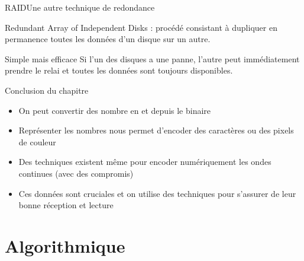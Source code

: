 \documentclass{beamer}
\begin{document}
\begin{frame}{RAID}{Une autre technique de redondance}
	\begin{definition}
		Redundant Array of Independent Disks : procédé consistant à dupliquer en permanence toutes les données d'un disque sur un autre.
	\end{definition}

	\begin{exampleblock}{Simple mais efficace}
		Si l'un des disques a une panne, l'autre peut immédiatement prendre le relai et toutes les données sont toujours disponibles.
	\end{exampleblock}
\end{frame}

\begin{frame}{Conclusion du chapitre}{}
	\begin{itemize}
		\item On peut convertir des nombre en et depuis le binaire
		\item Représenter les nombres nous permet d'encoder des caractères ou des pixels de couleur
		\item Des techniques existent même pour encoder numériquement les ondes continues (avec des compromis)
		\item Ces données sont cruciales et on utilise des techniques pour s'assurer de leur bonne réception et lecture
	\end{itemize}
\end{frame}

\section{Algorithmique}
\end{document}
